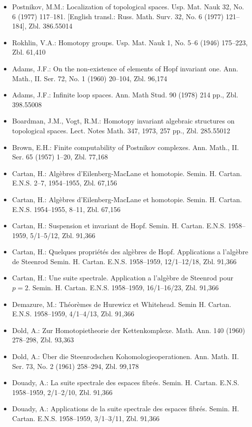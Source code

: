 \begin{itemize}
\item Postnikov, M.M.: Localization of topological spaces. Usp. Mat. Nauk 32, No. 6 (1977) 117--181. [English transl.: Russ. Math. Surv. 32, No. 6 (1977) 121--184], Zbl. 386.55014
\item Rokhlin, V.A.: Homotopy groups. Usp. Mat. Nauk 1, No. 5--6 (1946) 175--223, Zbl. 61,410
\item Adams, J.F.: On the non-existence of elements of Hopf invariant one. Ann. Math., II. Ser. 72, No. 1 (1960) 20--104, Zbl. 96,174
\item Adams, J.F.: Infinite loop spaces. Ann. Math Stud. 90 (1978) 214 pp., Zbl. 398.55008
\item Boardman, J.M., Vogt, R.M.: Homotopy invariant algebraic structures on topological spaces. Lect. Notes Math. 347, 1973, 257 pp., Zbl. 285.55012
\item Brown, E.H.: Finite computability of Postnikov complexes. Ann. Math., II. Ser. 65 (1957) 1--20, Zbl. 77,168
\item Cartan, H.: Algèbres d'Eilenberg-MacLane et homotopie. Semin. H. Cartan. E.N.S. 2--7, 1954--1955, Zbl. 67,156
\item Cartan, H.: Algèbres d'Eilenberg-MacLane et homotopie. Semin. H. Cartan. E.N.S. 1954--1955, 8--11, Zbl. 67,156
\item Cartan, H.: Suspension et invariant de Hopf. Semin. H. Cartan. E.N.S. 1958--1959, 5/1--5/12, Zbl. 91,366
\item Cartan, H.: Quelques propriétés des algèbres de Hopf. Applications a l'algèbre de Steenrod Semin. H. Cartan. E.N.S. 1958--1959, 12/1--12/18, Zbl. 91,366
\item Cartan, H.: Une suite spectrale. Application a l'algèbre de Steenrod pour $p=2$. Semin. H. Cartan. E.N.S. 1958--1959, 16/1--16/23, Zbl. 91,366
\item Demazure, M.: Théorèmes de Hurewicz et Whitehead. Semin H. Cartan. E.N.S. 1958--1959, 4/1--4/13, Zbl. 91,366
\item Dold, A.: Zur Homotopietheorie der Kettenkomplexe. Math. Ann. 140 (1960) 278--298, Zbl. 93,363
\item Dold, A.: Über die Steenrodschen Kohomologieoperationen. Ann. Math. II. Ser. 73, No. 2 (1961) 258--294, Zbl. 99,178
\item Douady, A.: La suite spectrale des espaces fibrés. Semin. H. Cartan. E.N.S. 1958--1959, 2/1--2/10, Zbl. 91,366
\item Douady, A.: Applications de la suite spectrale des espaces fibrés. Semin. H. Cartan. E.N.S. 1958--1959, 3/1--3/11, Zbl. 91,366

\end{itemize}
